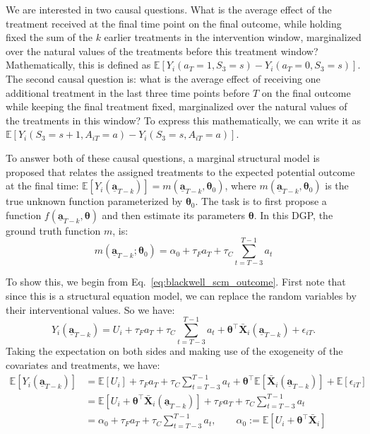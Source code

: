 We are interested in two causal questions.
What is the average effect of the treatment received at the final time point on 
the final outcome, while holding fixed the sum of the $k$ earlier treatments in 
the intervention window, marginalized over the natural values of the treatments 
before this treatment window?
Mathematically, 
this is defined as
$\mathbb{E}\left[ Y_i\left(a_T = 1, S_3 = s\right) 
- Y_i\left(a_T = 0, S_3 = s\right) \right]$. 
The second causal question is: what is the
average effect of receiving one additional treatment in 
the last three time points 
before $T$ on the final outcome while keeping the final treatment 
fixed, marginalized over the natural 
values of the treatments in this window? To express 
this mathematically, we can write it as
$\mathbb{E}\left[Y_i\left({S_3 = s+1, 
A_{iT} = a}\right) - Y_i\left({S_3 = s, 
A_{iT} = a}\right)\right]$. 

To answer both of these causal questions, a marginal structural 
model is proposed  
that relates the assigned treatments to the expected potential 
outcome at the final time: 
\(\mathbb{E}\left[Y_i\left(\underline{\mathbf{a}}_{T-k}\right)\right] = 
m(\underline{\mathbf{a}}_{T-k}, \boldsymbol{\theta}_0)\), where 
$m(\underline{\mathbf{a}}_{T-k}, \boldsymbol{\theta}_0)$ is the true unknown function 
parameterized by $\boldsymbol{\theta}_0$. The task is 
to first propose a function $f(\underline{\mathbf{a}}_{T-k}, \boldsymbol{\theta})$ 
and then estimate its parameters $\boldsymbol{\theta}$. In this 
DGP, the ground truth function $m$, is: 
\begin{equation}
    \label{eq:truemsm}
    m\left(\underline{\mathbf{a}}_{T-k}; \boldsymbol{\theta}_0 \right) = \alpha_0 + \tau_{F} a_T + \tau_{C} \sum_{t=T-3}^{T-1} a_t
\end{equation}

To show this, we begin from Eq.~\eqref{eq:blackwell_scm_outcome}. First note that since this is 
a structural equation model, we can replace the random variables 
by their interventional values. So we have:
\[
Y_i\!\left(\underline{\mathbf{a}}_{T-k}\right)
= U_i + \tau_F a_T + \tau_C \sum_{t=T-3}^{T-1} a_t + \boldsymbol{\theta}^\top \bar{\mathbf{X}}_{i}(\underline{\mathbf{a}}_{T-k}) + \epsilon_{iT}.
\]
Taking the expectation on both sides and making use of 
the exogeneity of the covariates and treatments, we have:
\begin{align}
\label{eq:truemsmproof}
\mathbb{E}\!\left[Y_i\!\left(\underline{\mathbf{a}}_{T-k}\right)\right]
&= \mathbb{E}[U_i] + \tau_F a_T + \tau_C \sum_{t=T-3}^{T-1} a_t
   + \boldsymbol{\theta}^\top \mathbb{E}[\bar{\mathbf{X}}_{i}(\underline{\mathbf{a}}_{T-k})] + \mathbb{E}[\epsilon_{iT}] \\
&= \mathbb{E}\!\left[U_i + \boldsymbol{\theta}^\top \bar{\mathbf{X}}_{i}(\underline{\mathbf{a}}_{T-k})\right]
   + \tau_F a_T + \tau_C \sum_{t=T-3}^{T-1} a_t \\
&= \alpha_0 + \tau_F a_T + \tau_C \sum_{t=T-3}^{T-1} a_t,
\qquad
\alpha_0 := \mathbb{E}\!\left[U_i + \boldsymbol{\theta}^\top \bar{\mathbf{X}}_{i}\right]
\end{align}
 
